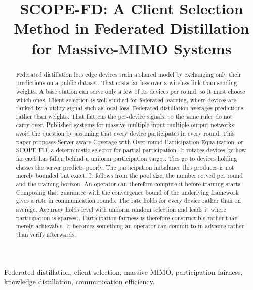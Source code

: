 \documentclass[journal]{IEEEtran}
\newcommand{\rev}[1]{{\color{blue}#1}}
\begin{document}
\title{SCOPE-FD: A Client Selection Method in Federated Distillation for Massive-MIMO Systems}

\author{
}

\maketitle

\begin{abstract}
\rev{Federated distillation lets edge devices train a shared model by exchanging only their predictions on a public dataset. That costs far less over a wireless link than sending weights. A base station can serve only a few of its devices per round, so it must choose which ones. Client selection is well studied for federated learning, where devices are ranked by a utility signal such as local loss. Federated distillation averages predictions rather than weights. That flattens the per-device signals, so the same rules do not carry over. Published systems for massive multiple-input multiple-output networks avoid the question by assuming that every device participates in every round. This paper proposes Server-aware Coverage with Over-round Participation Equalization, or SCOPE-FD, a deterministic selector for partial participation. It rotates devices by how far each has fallen behind a uniform participation target. Ties go to devices holding classes the server predicts poorly. The participation imbalance this produces is not merely bounded but exact. It follows from the pool size, the number served per round and the training horizon. An operator can therefore compute it before training starts. Composing that guarantee with the convergence bound of the underlying framework gives a rate in communication rounds. The rate holds for every device rather than on average. Accuracy holds level with uniform random selection and leads it where participation is sparsest. Participation fairness is therefore constructible rather than merely achievable. It becomes something an operator can commit to in advance rather than verify afterwards.}
\end{abstract}

\begin{IEEEkeywords}
Federated distillation, client selection, massive MIMO, participation fairness, knowledge distillation, communication efficiency.
\end{IEEEkeywords}
\end{document}
